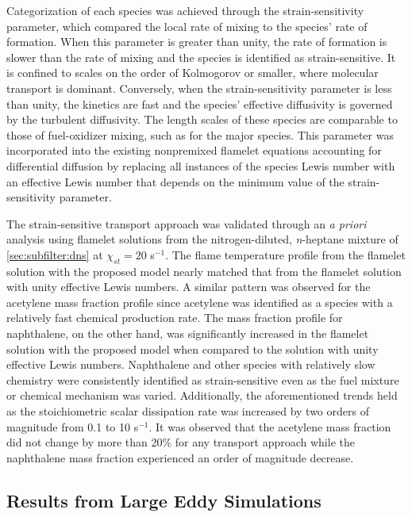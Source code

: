 Categorization of each species was achieved through the strain-sensitivity parameter, which compared the local rate of mixing to the species' rate of formation. When this parameter is greater than unity, the rate of formation is slower than the rate of mixing and the species is identified as strain-sensitive. It is confined to scales on the order of Kolmogorov or smaller, where molecular transport is dominant. Conversely, when the strain-sensitivity parameter is less than unity, the kinetics are fast and the species' effective diffusivity is governed by the turbulent diffusivity. The length scales of these species are comparable to those of fuel-oxidizer mixing, such as for the major species. This parameter was incorporated into the existing nonpremixed flamelet equations accounting for differential diffusion by replacing all instances of the species Lewis number with an effective Lewis number that depends on the minimum value of the strain-sensitivity parameter.

The strain-sensitive transport approach was validated through an \textit{a priori} analysis using flamelet solutions from the nitrogen-diluted, \textit{n}-heptane mixture of \cref{sec:subfilter:dns} at $\chi_{st} = 20$ s$^{-1}$. The flame temperature profile from the flamelet solution with the proposed model nearly matched that from the flamelet solution with unity effective Lewis numbers. A similar pattern was observed for the acetylene mass fraction profile since acetylene was identified as a species with a relatively fast chemical production rate. The mass fraction profile for naphthalene, on the other hand, was significantly increased in the flamelet solution with the proposed model when compared to the solution with unity effective Lewis numbers. Naphthalene and other species with relatively slow chemistry were consistently identified as strain-sensitive even as the fuel mixture or chemical mechanism was varied. Additionally, the aforementioned trends held as the stoichiometric scalar dissipation rate was increased by two orders of magnitude from 0.1 to 10 s$^{-1}$. It was observed that the acetylene mass fraction did not change by more than 20\% for any transport approach while the naphthalene mass fraction experienced an order of magnitude decrease.

\subsection{Results from Large Eddy Simulations}
\label{sec:conclusion:contributions:les}

